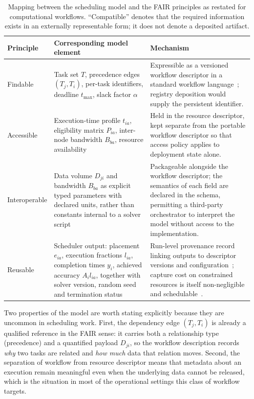 \begin{table}[t]
\centering
\caption{Mapping between the scheduling model and the FAIR principles as restated for computational
workflows. ``Compatible'' denotes that the required information exists in an externally
representable form; it does not denote a deposited artifact.}
\label{tab:fair_mapping}
\small
\begin{tabular}{|p{}|p{}|p{}|}
\hline
\textbf{Principle} & \textbf{Corresponding model element} & \textbf{Mechanism} \\
\hline
Findable & Task set $T$, precedence edges $(T_j,T_i)$, per-task identifiers, deadline $t_{\max}$,
slack factor $\alpha$ & Expressible as a versioned workflow descriptor in a standard workflow
language~\cite{crusoe2022cwl}; registry deposition would supply the persistent identifier. \\
\hline
Accessible & Execution-time profile $t_{ia}$, eligibility matrix $P_{ia}$, inter-node bandwidth
$B_{ba}$, resource availability & Held in the resource descriptor, kept separate from the portable
workflow descriptor so that access policy applies to deployment state alone. \\
\hline
Interoperable & Data volume $D_{ji}$ and bandwidth $B_{ba}$ as explicit typed parameters with
declared units, rather than constants internal to a solver script & Packageable alongside the
workflow descriptor; the semantics of each field are declared in the schema, permitting a
third-party orchestrator to interpret the model without access to the implementation. \\
\hline
Reusable & Scheduler output: placement $e_{ia}$, execution fractions $l_{ia}$, completion times
$y_i$, achieved accuracy $A_i l_{ia}$, together with solver version, random seed and termination
status & Run-level provenance record linking outputs to descriptor versions and
configuration~\cite{leo2024workflowruncrate}; capture cost on constrained resources is itself
non-negligible and schedulable~\cite{rosendo2023provlight}. \\
\hline
\end{tabular}
\end{table}

Two properties of the model are worth stating explicitly because they are uncommon in scheduling
work. First, the dependency edge $(T_j,T_i)$ is already a qualified reference in the FAIR sense: it
carries both a relationship type (precedence) and a quantified payload $D_{ji}$, so the workflow
description records \emph{why} two tasks are related and \emph{how much} data that relation moves.
Second, the separation of workflow from resource descriptor means that metadata about an execution
remain meaningful even when the underlying data cannot be released, which is the situation in most
of the operational settings this class of workflow targets.



